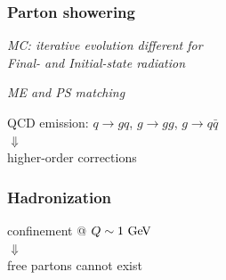\begin{frame}\frametitle{Parton showering}
\centering\myskip

\begin{flushright}\footnotesize {\it MC: iterative evolution different for\\Final- and Initial-state radiation}\end{flushright}
\begin{flushright}\footnotesize {\it ME and PS matching}\end{flushright}

\vspace{.4\paperheight}


QCD emission: $q\to gq$, $g\to gg$, $g\to q\bar{q}$\\
{\LARGE $\Downarrow$}\\
higher-order corrections 


\end{frame}

\begin{frame}\frametitle{Hadronization}
\centering



\vspace{.25\paperheight}

{\cccolor confinement} @ $Q\sim 1\gev$\\
{\LARGE $\Downarrow$}\\
free partons cannot exist


\end{frame}


